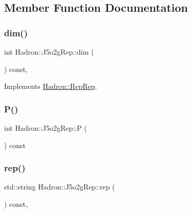 \subsection{Member Function Documentation}
\mbox{\label{structHadron_1_1J5o2gRep_a28245b28e8ded3f052453178f8d57da9}} 
\subsubsection{\texorpdfstring{dim()}{dim()}}
{\footnotesize\ttfamily int Hadron\+::\+J5o2g\+Rep\+::dim (\begin{DoxyParamCaption}{ }\end{DoxyParamCaption}) const\hspace{0.3cm}{\ttfamily [inline]}, {\ttfamily [virtual]}}



Implements \mbox{\hyperlink{structHadron_1_1RepRep_a92c8802e5ed7afd7da43ccfd5b7cd92b}{Hadron\+::\+Rep\+Rep}}.

\mbox{\label{structHadron_1_1J5o2gRep_a6ffd7d1f06f5779fdf3ecdd30a5f0f10}} 
\subsubsection{\texorpdfstring{P()}{P()}}
{\footnotesize\ttfamily int Hadron\+::\+J5o2g\+Rep\+::P (\begin{DoxyParamCaption}{ }\end{DoxyParamCaption}) const\hspace{0.3cm}{\ttfamily [inline]}}

\mbox{\label{structHadron_1_1J5o2gRep_aac8af1cb5d895e8c83ccdaa520338573}} 
\subsubsection{\texorpdfstring{rep()}{rep()}}
{\footnotesize\ttfamily std\+::string Hadron\+::\+J5o2g\+Rep\+::rep (\begin{DoxyParamCaption}{ }\end{DoxyParamCaption}) const\hspace{0.3cm}{\ttfamily [inline]}, {\ttfamily [virtual]}}



